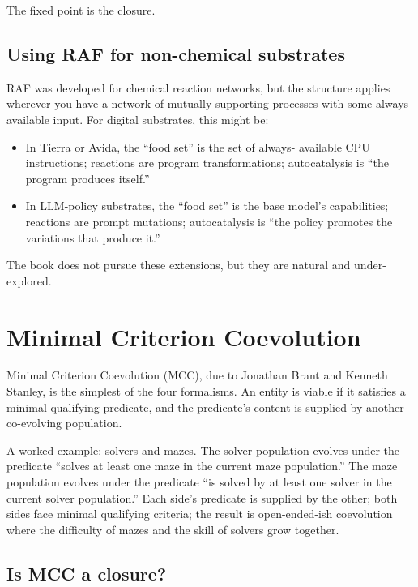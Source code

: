The fixed point is the closure.

\subsection*{Using RAF for non-chemical substrates}

RAF was developed for chemical reaction networks, but the structure
applies wherever you have a network of mutually-supporting processes
with some always-available input. For digital substrates, this might
be:

\begin{itemize}[leftmargin=1.5em,itemsep=2pt]
  \item In Tierra or Avida, the ``food set'' is the set of always-
    available CPU instructions; reactions are program transformations;
    autocatalysis is ``the program produces itself.''
  \item In LLM-policy substrates, the ``food set'' is the base model's
    capabilities; reactions are prompt mutations; autocatalysis is
    ``the policy promotes the variations that produce it.''
\end{itemize}

The book does not pursue these extensions, but they are natural and
under-explored.

\section{Minimal Criterion Coevolution}

Minimal Criterion Coevolution (MCC), due to Jonathan Brant and
Kenneth Stanley, is the simplest of the four formalisms. An entity is
viable if it satisfies a minimal qualifying predicate, and the
predicate's content is supplied by another co-evolving population.

A worked example: solvers and mazes. The solver population evolves
under the predicate ``solves at least one maze in the current maze
population.'' The maze population evolves under the predicate ``is
solved by at least one solver in the current solver population.'' Each
side's predicate is supplied by the other; both sides face minimal
qualifying criteria; the result is open-ended-ish coevolution where
the difficulty of mazes and the skill of solvers grow together.

\subsection*{Is MCC a closure?}

